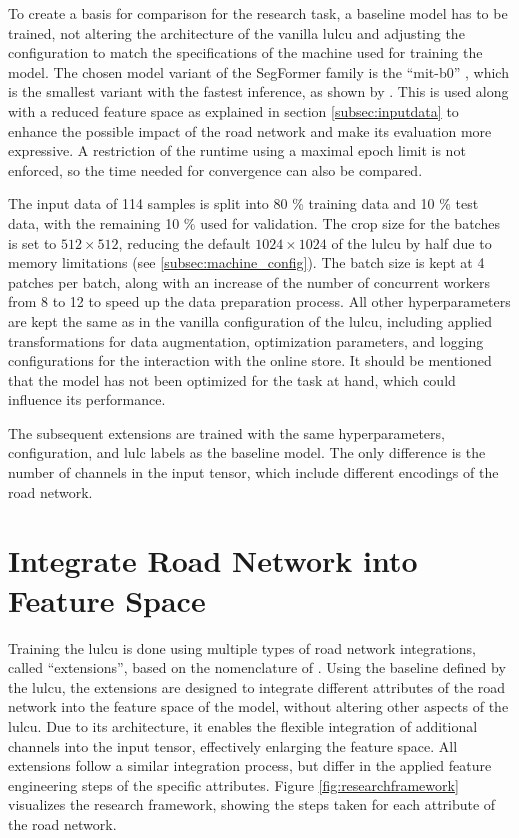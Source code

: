 To create a basis for comparison for the research task, a baseline model has to be trained, not altering the architecture of the vanilla \gls{lulcu} and adjusting the configuration to match the specifications of the machine used for training the model. The chosen model variant of the SegFormer family is the \enquote{\gls{mit}-b0} \autocite{HuggingFace2024}, which is the smallest variant with the fastest inference, as shown by \textcite{Tzepkenlis.Marthoglou.ea2023,Xie.Wang.ea2021}. This is used along with a reduced feature space as explained in section \ref{subsec:inputdata} to enhance the possible impact of the road network and make its evaluation more expressive. A restriction of the runtime using a maximal epoch limit is not enforced, so the time needed for convergence can also be compared.

The input data of 114 samples is split into 80 \% training data and 10 \% test data, with the remaining 10 \% used for validation. The crop size for the batches is set to \( 512 \times 512 \), reducing the default \( 1024 \times 1024 \) of the \gls{lulcu} by half due to memory limitations (see \ref{subsec:machine_config}). The batch size is kept at 4 patches per batch, along with an increase of the number of concurrent workers from 8 to 12 to speed up the data preparation process. All other hyperparameters are kept the same as in the vanilla configuration of the \gls{lulcu}, including applied transformations for data augmentation, optimization parameters, and logging configurations for the interaction with the online store. It should be mentioned that the model has not been optimized for the task at hand, which could influence its performance.

The subsequent extensions are trained with the same hyperparameters, configuration, and \gls{lulc} labels as the baseline model. The only difference is the number of channels in the input tensor, which include different encodings of the road network.

\section{Integrate Road Network into Feature Space}
\label{subsec:integration}

Training the \gls{lulcu} is done using multiple types of road network integrations, called \enquote{extensions}, based on the nomenclature of \textcite{Alhassan.Henry.ea2020}. Using the baseline defined by the \gls{lulcu}, the extensions are designed to integrate different attributes of the road network into the feature space of the model, without altering other aspects of the \gls{lulcu}. Due to its architecture, it enables the flexible integration of additional channels into the input tensor, effectively enlarging the feature space. All extensions follow a similar integration process, but differ in the applied feature engineering steps of the specific attributes. Figure \ref{fig:researchframework} visualizes the research framework, showing the steps taken for each attribute of the road network.

